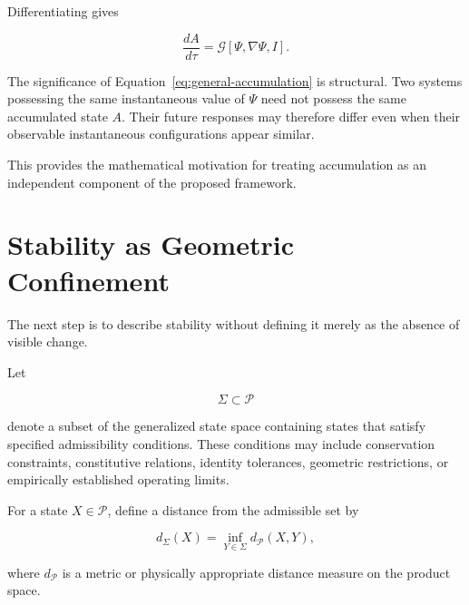 \documentclass[12pt,oneside]{book}
\begin{document}
Differentiating gives

\begin{equation}
    \frac{dA}{d\tau}
    =
    \mathcal{G}
    \left[
        \Psi,
        \nabla\Psi,
        I
    \right].
    \label{eq:accumulation-rate}
\end{equation}

The significance of
Equation~\eqref{eq:general-accumulation} is structural. Two
systems possessing the same instantaneous value of \(\Psi\)
need not possess the same accumulated state \(A\). Their future
responses may therefore differ even when their observable
instantaneous configurations appear similar.

This provides the mathematical motivation for treating
accumulation as an independent component of the proposed
framework.


\section{Stability as Geometric Confinement}
\label{sec:stability-geometric-confinement}

The next step is to describe stability without defining it
merely as the absence of visible change.

Let

\begin{equation}
    \Sigma
    \subset
    \mathcal{P}
    \label{eq:stability-manifold}
\end{equation}

denote a subset of the generalized state space containing states
that satisfy specified admissibility conditions. These
conditions may include conservation constraints, constitutive
relations, identity tolerances, geometric restrictions, or
empirically established operating limits.

For a state \(X\in\mathcal{P}\), define a distance from the
admissible set by

\begin{equation}
    d_{\Sigma}(X)
    =
    \inf_{Y\in\Sigma}
    d_{\mathcal{P}}(X,Y),
    \label{eq:distance-from-stability-manifold}
\end{equation}

where \(d_{\mathcal{P}}\) is a metric or physically appropriate
distance measure on the product space.
\end{document}
